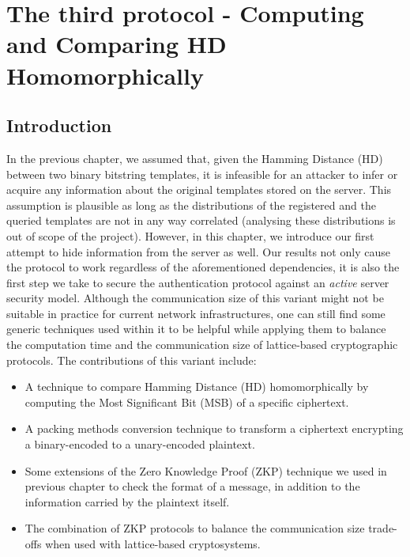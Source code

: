 \chapter{The third protocol - Computing and Comparing HD Homomorphically}
\label{chap:thirdProtocol}

\ifpdf
\graphicspath{{Chapter5/Figs/Raster/}{Chapter5/Figs/PDF/}{Chapter5/Figs/}}
\else
\graphicspath{{Chapter5/Figs/Vector/}{Chapter5/Figs/}}
\fi


\section{Introduction}
\label{sub:introChap3}
In the previous chapter, we assumed that, given the Hamming Distance (HD) between two
binary bitstring templates, it is infeasible for an attacker to infer or acquire any information
about the original templates stored on the server. This assumption is plausible as long as the
distributions of the registered and the queried templates are not in any way
correlated (analysing these distributions is out of scope of the
project). However, in this chapter, we introduce our first attempt to hide 
information from the server as well. Our results not only cause the protocol
to work regardless of the aforementioned dependencies, it is also the first step we take to
secure the authentication protocol against an \textit{active} server security model. Although the communication size of this variant might not
be suitable in practice for current network infrastructures, one can
still find some generic techniques used within it to be helpful while
applying them to balance the computation time and the communication size of
lattice-based cryptographic protocols. The contributions of this variant include:
\begin{itemize}
\item A technique to compare Hamming Distance (HD) homomorphically by computing
  the Most Significant Bit (MSB) of a specific ciphertext.
\item A packing methods conversion technique to transform a ciphertext
  encrypting a binary-encoded to a unary-encoded plaintext.
\item Some extensions of the Zero Knowledge Proof (ZKP) technique we used
  in previous chapter to check the format of a message, in addition to the
  information carried by the plaintext itself.
\item The combination of ZKP protocols to balance the communication size
  trade-offs when used with lattice-based cryptosystems.
\end{itemize}

